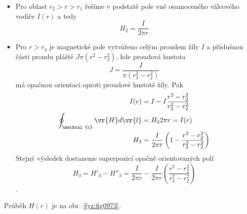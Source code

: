 \begin{mdframed}[style=mdexam]
\begin{example}
\begin{itemize}
      \item Pro oblast $r_2>r>r_1$ řešíme v podstatě pole vně osamoceného válcového vodiče $I(r)$ a
            tedy $$H_2 = \frac{I}{2\pi r}$$
      \item Pro $r>r_3$ je magnetické pole vytvářeno celým proudem žíly $I$ a příslušnou částí
            proudu pláště $J\pi(r^2 - r_2^2)$, kde proudová hustota $$J =
            \frac{I}{\pi(r_3^2-r_2^2)}$$ má opačnou orientaci oproti proudové hustotě žíly. Pak 
            \begin{align*}
              I(r)                             &= I - I\frac{r^2-r_2^2}{r_3^2-r_2^2} \\
              \oint_{\mathcal{c}}\vr{H}d\vr{l} &= H_32\pi r = I(r)                   \\          
              H_3                              &= \frac{I}{2\pi r}\left(1 - 
              \frac{r^2 - r_2^2}{r_3^2 - r_2^2}\right) 
            \end{align*}
            Stejný výsledek dostaneme superpozicí opačně orientovaných polí
            $$H_3 = H'_3 - H''_3 = \frac{I}{2\pi r} - \frac{I}{2\pi r}\left(\frac{r^2 - r_2^2}{r_3^2
            - r_2^2}\right)$$. 
    \end{itemize}
    Průběh $H(r)$ je na obr. \ref{fyz:fig0973}.
  \end{example}
\end{mdframed}